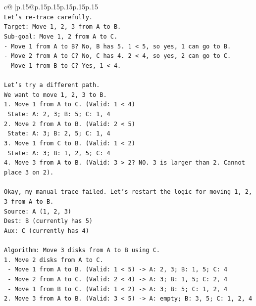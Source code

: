 \documentclass{article}
\begin{document}
{\begin{supertabular}{c@{$\;$}|p{.15\linewidth}@{}p{.15\linewidth}p{.15\linewidth}p{.15\linewidth}p{.15\linewidth}p{.15\linewidth}}
{{{\\ 
\texttt{Let's re{-}trace carefully.} \\
\texttt{Target: Move 1, 2, 3 from A to B.} \\
\texttt{Sub{-}goal: Move 1, 2 from A to C.} \\
\texttt{{-} Move 1 from A to B? No, B has 5. 1 < 5, so yes, 1 can go to B.} \\
\texttt{{-} Move 2 from A to C? No, C has 4. 2 < 4, so yes, 2 can go to C.} \\
\texttt{{-} Move 1 from B to C? Yes, 1 < 4.} \\
\\ 
\texttt{Let's try a different path.} \\
\texttt{We want to move 1, 2, 3 to B.} \\
\texttt{1. Move 1 from A to C. (Valid: 1 < 4)} \\
\texttt{   State: A: 2, 3; B: 5; C: 1, 4} \\
\texttt{2. Move 2 from A to B. (Valid: 2 < 5)} \\
\texttt{   State: A: 3; B: 2, 5; C: 1, 4} \\
\texttt{3. Move 1 from C to B. (Valid: 1 < 2)} \\
\texttt{   State: A: 3; B: 1, 2, 5; C: 4} \\
\texttt{4. Move 3 from A to B. (Valid: 3 > 2? NO. 3 is larger than 2. Cannot place 3 on 2).} \\
\\ 
\texttt{Okay, my manual trace failed. Let's restart the logic for moving 1, 2, 3 from A to B.} \\
\texttt{Source: A (1, 2, 3)} \\
\texttt{Dest: B (currently has 5)} \\
\texttt{Aux: C (currently has 4)} \\
\\ 
\texttt{Algorithm: Move 3 disks from A to B using C.} \\
\texttt{1. Move 2 disks from A to C.} \\
\texttt{   {-} Move 1 from A to B. (Valid: 1 < 5) {-}> A: 2, 3; B: 1, 5; C: 4} \\
\texttt{   {-} Move 2 from A to C. (Valid: 2 < 4) {-}> A: 3; B: 1, 5; C: 2, 4} \\
\texttt{   {-} Move 1 from B to C. (Valid: 1 < 2) {-}> A: 3; B: 5; C: 1, 2, 4} \\
\texttt{2. Move 3 from A to B. (Valid: 3 < 5) {-}> A: empty; B: 3, 5; C: 1, 2, 4} \\
}}}
\end{supertabular}}
\end{document}
